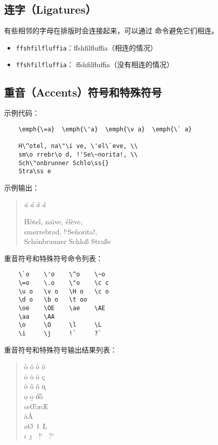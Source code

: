 \documentclass[UTF8]{ctexart}
\begin{document}
\subsection{连字（Ligatures）}
有些相邻的字母在排版时会连接起来，可以通过 \texttt{\mbox{}} 命令避免它们相连。
\begin{itemize}
    \item \texttt{ffshfilfluffia}：ffshfilfluffia（相连的情况）
    \item \texttt{f\mbox{}fshf\mbox{}ilf\mbox{}luf\mbox{}f\mbox{}ia}：
    f\mbox{}fshf\mbox{}ilf\mbox{}luf\mbox{}f\mbox{}ia（没有相连的情况）
\end{itemize}

\subsection{重音（Accents）符号和特殊符号}
示例代码：
\begin{verbatim}
    \emph{\=a}  \emph{\'a}  \emph{\v a}  \emph{\` a}

    H\^otel, na\"\i ve, \'el\`eve, \\
    sm\o rrebr\o d, !'Se\~norita!, \\
    Sch\"onbrunner Schlo\ss{}
    Stra\ss e
\end{verbatim}

示例输出：
\begin{quote}
    \emph{\=a} \qquad \emph{\'a} \qquad \emph{\v a} \qquad \emph{\` a}

    H\^otel, na\"\i ve, \'el\`eve, \\
    sm\o rrebr\o d, !`Se\~norita!, \\
    Sch\"onbrunner Schlo\ss{}
    Stra\ss e
\end{quote}

重音符号和特殊符号命令列表：
\begin{verbatim}
    \`o    \'o    \^o    \~o
    \=o    \.o    \"o    \c c
    \u o   \v o   \H o   \c o
    \d o   \b o   \t oo
    \oe    \OE    \ae    \AE
    \aa    \AA
    \o     \O     \l     \L
    \i     \j     !`     ?`
\end{verbatim}

重音符号和特殊符号输出结果列表：
\begin{quote}
    \`o  \qquad  \'o  \qquad  \^o  \qquad  \~o \\
    \=o  \qquad  \.o  \qquad  \"o  \qquad  \c c \\
    \u o \qquad  \v o \qquad  \H o \qquad  \c o \\
    \d o \qquad  \b o \qquad  \t oo \\
    \oe  \qquad  \OE  \qquad  \ae  \qquad  \AE \\
    \aa  \qquad  \AA \\
    \o   \qquad  \O   ~\qquad  \l   ~\qquad  \L \\
    \i   ~\qquad  \j   ~~\qquad  !`   ~\qquad  ?` \\
\end{quote}
\end{document}
